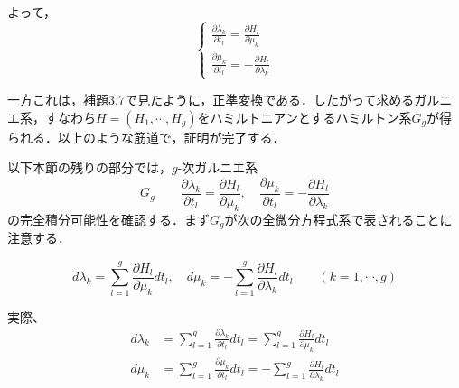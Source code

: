 よって，
\[
\begin{cases}
    \displaystyle \frac{\partial \lambda_k}{\partial t_l} = \frac{\partial H_l}{\partial \mu_k} \\
    \displaystyle \frac{\partial \mu_k}{\partial t_l} = - \frac{\partial H_l}{\partial \lambda_k}
\end{cases}
\]
\begin{story}
一方これは，補題3.7で見たように，正準変換である．したがって求めるガルニエ系，すなわち$H=(H_1, \cdots, H_g)$をハミルトニアンとするハミルトン系$G_g$が得られる．以上のような筋道で，証明が完了する．

以下本節の残りの部分では，$g$-次ガルニエ系
\begin{equation*}
    G_g \qquad \frac{\partial \lambda_k}{\partial t_l} = \frac{\partial H_l}{\partial \mu_k}, \quad \frac{\partial \mu_k}{\partial t_l} = - \frac{\partial H_l}{\partial \lambda_k}
\end{equation*}
の完全積分可能性を確認する．まず$G_g$が次の全微分方程式系で表されることに注意する．

\begin{equation}
    d\lambda_k = \sum_{l=1}^g \frac{\partial H_l}{\partial \mu_k} dt_l, \quad d\mu_k = - \sum_{l=1}^g \frac{\partial H_l}{\partial \lambda_k} dt_l \qquad (k=1, \cdots, g) \tag{3.94}
\end{equation}

\end{story}
実際、
\begin{align*}
    d\lambda_k &= \sum_{l=1}^g \frac{\partial \lambda_k}{\partial t_l} dt_l = \sum_{l=1}^g \frac{\partial H_l}{\partial \mu_k} dt_l \\
    d\mu_k &= \sum_{l=1}^g \frac{\partial \mu_k}{\partial t_l} dt_l = -\sum_{l=1}^g \frac{\partial H_l}{\partial \lambda_k} dt_l
\end{align*}

